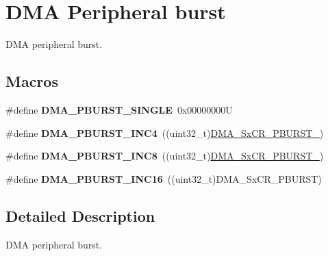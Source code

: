 \hypertarget{group___d_m_a___peripheral__burst}{}\section{D\+MA Peripheral burst}
\label{group___d_m_a___peripheral__burst}


D\+MA peripheral burst.  


\subsection*{Macros}
\begin{DoxyCompactItemize}
\item 
\mbox{\label{group___d_m_a___peripheral__burst_ga1ee9cf4dc1c8bfc5ab6dfb95a00f81ff}} 
\#define {\bfseries D\+M\+A\+\_\+\+P\+B\+U\+R\+S\+T\+\_\+\+S\+I\+N\+G\+LE}~0x00000000U
\item 
\mbox{\label{group___d_m_a___peripheral__burst_gacc54efc746528ed9e0173dad956f7caf}} 
\#define {\bfseries D\+M\+A\+\_\+\+P\+B\+U\+R\+S\+T\+\_\+\+I\+N\+C4}~((uint32\+\_\+t)\hyperlink{group___peripheral___registers___bits___definition_gadf0eee1ad1788868a194f95107057a16}{D\+M\+A\+\_\+\+Sx\+C\+R\+\_\+\+P\+B\+U\+R\+S\+T\+\_})
\item 
\mbox{\label{group___d_m_a___peripheral__burst_gaf76dd9b208c8606e8c5ae7abf8c26532}} 
\#define {\bfseries D\+M\+A\+\_\+\+P\+B\+U\+R\+S\+T\+\_\+\+I\+N\+C8}~((uint32\+\_\+t)\hyperlink{group___peripheral___registers___bits___definition_ga061207b2c654a0dd62e40187c9557eda}{D\+M\+A\+\_\+\+Sx\+C\+R\+\_\+\+P\+B\+U\+R\+S\+T\+\_})
\item 
\mbox{\label{group___d_m_a___peripheral__burst_ga705a631ea96b34aa5afa7fed06a487e0}} 
\#define {\bfseries D\+M\+A\+\_\+\+P\+B\+U\+R\+S\+T\+\_\+\+I\+N\+C16}~((uint32\+\_\+t)D\+M\+A\+\_\+\+Sx\+C\+R\+\_\+\+P\+B\+U\+R\+ST)
\end{DoxyCompactItemize}


\subsection{Detailed Description}
D\+MA peripheral burst. 


